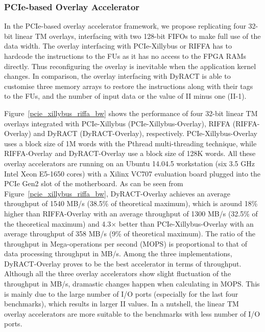 \subsubsection{PCIe-based Overlay Accelerator}
In the PCIe-based overlay accelerator framework, we propose replicating four 32-bit linear TM overlays, interfacing with two 128-bit FIFOs to make full use of the data width.
The overlay interfacing with PCIe-Xillybus or RIFFA has to hardcode the instructions to the FUs as it has no access to the FPGA RAMs directly. 
Thus reconfiguring the overlay is inevitable when the application kernel changes. 
In comparison, the overlay interfacing with DyRACT is able to customise three memory arrays to restore the instructions along with their tags to the FUs, and the number of input data or the value of II minus one (II-1). 


Figure~\ref{pcie_xillybus_riffa_bw} shows the performance of four 32-bit linear TM overlays integrated with PCIe-Xillybus (PCIe-Xillybus-Overlay), RIFFA (RIFFA-Overlay) and DyRACT (DyRACT-Overlay), respectively. 
PCIe-Xillybus-Overlay uses a block size of 1M words with the Pthread multi-threading technique, while RIFFA-Overlay and DyRACT-Overlay use a block size of 128K words. 
All these overlay accelerators are running on an Ubuntu 14.04.5 workstation (six 3.5 GHz Intel Xeon E5-1650 cores) with a Xilinx VC707 evaluation board plugged into the PCIe Gen2 slot of the motherboard. 
As can be seen from Figure~\ref{pcie_xillybus_riffa_bw}, DyRACT-Overlay achieves an average throughput of 1540 MB/s (38.5\% of theoretical maximum), which is around 18\% higher than RIFFA-Overlay with an average throughput of 1300 MB/s (32.5\% of the theoretical maximum) and 4.3$\times$ better than PCIe-Xillybus-Overlay with an average throughput of 358 MB/s (9\% of theoretical maximum). 
The ratio of the throughput in Mega-operations per second (MOPS) is proportional to that of data processing throughput in MB/s. 
Among the three implementations, DyRACT-Overlay proves to be the best accelerator in terms of throughput. 
Although all the three overlay accelerators show slight fluctuation of the throughput in MB/s, dramastic changes happen when calculating in MOPS. 
This is mainly due to the large number of I/O ports (especially for the last four benchmarks), which results in larger II values. 
In a nutshell, the linear TM overlay accelerators are more suitable to the benchmarks with less number of I/O ports. 



